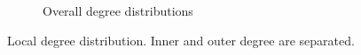 \begin{figure}[h]
\begin{subfigure}[b]{0.400\textwidth}
            \caption {{\small Overall degree distributions}}    
            \label{fig:mean and std of net24}
        \end{subfigure}
        \caption{Local degree distribution. Inner and outer degree are separated.} 
    \label{fig:real_graph}
\end{figure}
